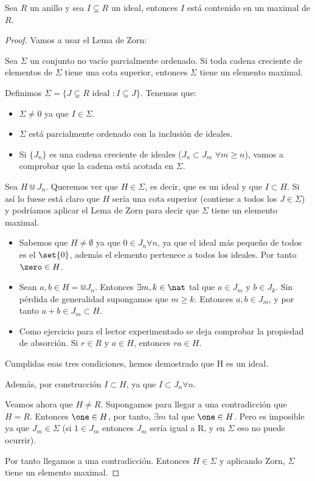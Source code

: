 \begin{theorem}
	Sea $R$ un anillo y sea $I \subsetneq R$ un ideal, entonces $I$ está contenido en un maximal de $R$.
\end{theorem}
\begin{proof}
Vamos a usar el Lema de Zorn:
\begin{lemma}
Sea $\Sigma$ un conjunto no vacío parcialmente ordenado. Si toda cadena creciente de elementos de $\Sigma$ tiene una cota superior, entonces $\Sigma$ tiene un elemento maximal.
\end{lemma}

Definimos $\Sigma = \{J \subsetneq R \text{ ideal }: I\subseteq J \}$. Tenemos que:
\begin{itemize}
	\item $\Sigma \neq 0$ ya que $I \in \Sigma$.
	\item $\Sigma$ está parcialmente ordenado con la inclusión de ideales.
	\item Si $\{ J_n\}$ es una cadena creciente de ideales ($J_n \subset J_m$ $\forall m\geq n$), vamos a comprobar que la cadena está acotada en $\Sigma$.
\end{itemize}
Sea $H \Cup J_n$. Queremos ver que $H \in \Sigma$, es decir, que es un ideal y que $I \subset H$. Si así lo fuese está claro que $H$ sería una cota superior (contiene a todos los $J \in \Sigma$) y podríamos aplicar el Lema de Zorn para decir que $\Sigma$ tiene un elemento maximal.

\begin{itemize}
	\item Sabemos que $H \neq \emptyset$ ya que $0 \in J_n \forall n$, ya que el ideal más pequeño de todos es el $\set{0}$, además el elemento \zero pertenece a todos los ideales. Por tanto $\zero \in H$.
	\item Sean $a,b \in H=\Cup J_n$.  Entonces $\exists m,k \in \nat$ tal que $a \in J_m$ y $b \in J_k$. Sin pérdida de generalidad supongamos que $m \geq k$. Entonces $a,b \in J_m$, y por tanto $a+b \in J_m \subset H$.
	\item Como ejercicio para el lector experimentado se deja comprobar la propiedad de absorción. Si $r\in R$ y $a \in H$, entonces $ra \in H$.
\end{itemize}
Cumplidas esas tres condiciones, hemos demostrado que H es un ideal.

Además, por construcción $I \subset H$, ya que $I \subset J_n \forall n$.

Veamos ahora que $H \neq R$. Supongamos para llegar a una contradicción que $H=R$. Entonces $\one \in H$, por tanto, $\exists m$ tal que $\one \in H$. Pero es imposible ya que $J_m \in \Sigma$ (si $1 \in J_m$ entonces $J_m$ sería igual a R, y en $\Sigma$ eso no puede ocurrir).

Por tanto llegamos a una contradicción. Entonces $H \in \Sigma$ y aplicando Zorn, $\Sigma$ tiene un elemento maximal.
\end{proof}

